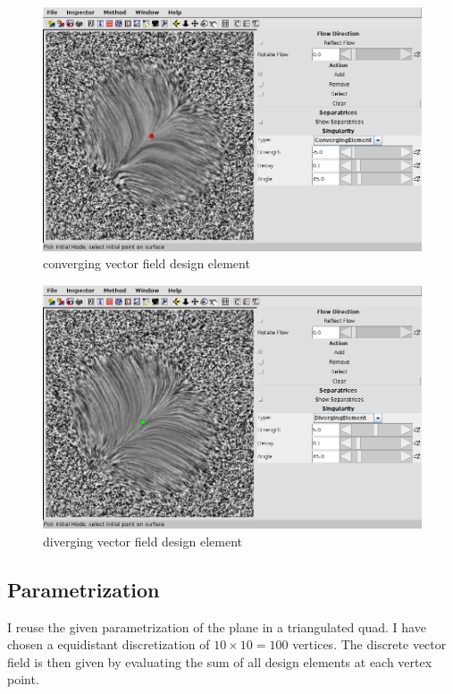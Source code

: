\documentclass[a4paper,10pt,notitlepage]{scrartcl}
\begin{document}
\begin{figure}
  \centering
  \includegraphics[scale=0.5]{img-3-2/converging.png}
  \caption{converging vector field design element}
  \label{fig:converging}
\end{figure}

\begin{figure}
  \centering
  \includegraphics[scale=0.5]{img-3-2/diverging.png}
  \caption{diverging vector field design element}
  \label{fig:diverging}
\end{figure}

\subsection{Parametrization}

I reuse the given parametrization of the plane in a triangulated quad. I have
chosen a equidistant discretization of $10 \times 10 = 100$ vertices. The
discrete vector field is then given by evaluating the sum of all design
elements at each vertex point.
\end{document}
